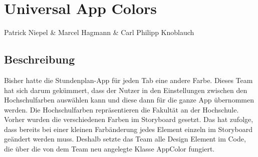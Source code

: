 \chapter{Universal App Colors}
Patrick Niepel \& Marcel Hagmann \& Carl Philipp Knoblauch

\section{Beschreibung}
Bisher hatte die Stundenplan-App für jeden Tab eine andere Farbe. Dieses Team hat sich darum gekümmert, dass der Nutzer in den Einstellungen  zwischen den Hochschulfarben auswählen kann und diese dann für die ganze App übernommen werden. Die Hochschulfarben repräsentieren die Fakultät an der Hochschule. Vorher wurden die verschiedenen Farben im Storyboard gesetzt. Das hat zufolge, dass bereits bei einer kleinen Farbänderung jedes Element einzeln im Storyboard geändert werden muss.
Deshalb setzte das Team alle Design Element im Code, die über die von dem Team neu angelegte Klasse AppColor fungiert.

